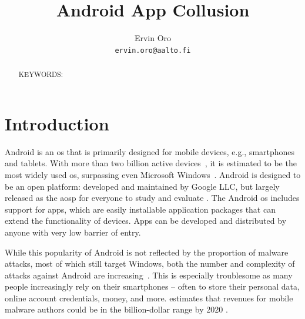 \documentclass[article, oneside]{aaltoseries}
\title{Android App Collusion}
\author{Ervin Oro%
\\\textnormal{\texttt{ervin.oro@aalto.fi}}} %
\affiliation{\textbf{Tutor}: Jorden Whitefield} %
\newcommand{\TODO}[1]{\todo[inline]{#1}}
\begin{document}

\maketitle
{}

\begin{abstract}
\TODO{abstract}

\vspace{3mm}
\noindent KEYWORDS: 

\end{abstract}


\section{Introduction}
\label{sec:intro}

Android is an \gls{os} that is primarily designed for mobile devices, e.g., smartphones and tablets. With more than two billion active devices~\cite{AOSP2018}, it is estimated to be the most widely used \gls{os}, surpassing even Microsoft Windows~\cite{AWSLLC2018, StatCounter2018}. Android is designed to be an open platform: developed and maintained by Google LLC, but largely released as the \gls{aosp} for everyone to study and evaluate \cite{AOSP}. The Android \gls{os} includes support for apps, which are easily installable application packages that can extend the functionality of devices. Apps can be developed and distributed by anyone with very low barrier of entry.

While this popularity of Android is not reflected by the proportion of malware attacks, most of which still target Windows, both the number and complexity of attacks against Android are increasing~\cite{AVTESTGH2018}. This is especially troublesome as many people increasingly rely on their smartphones -- often to store their personal data, online account credentials, money, and more. \citeauthor{McAfee2018} estimates that revenues for mobile malware authors could be in the billion-dollar range by 2020 \cite{McAfee2018}.
\end{document}
